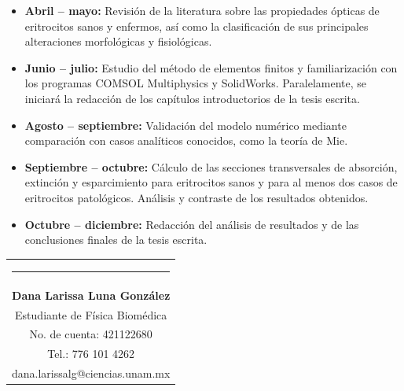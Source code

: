 \documentclass[11pt,letterpaper]{article}
\begin{document}
	\begin{itemize} 
		\item \textbf{Abril – mayo:} Revisión de la literatura sobre las propiedades ópticas de eritrocitos sanos y enfermos, así como la clasificación de sus principales alteraciones morfológicas y fisiológicas.
		\item \textbf{Junio – julio:} Estudio del método de elementos finitos y familiarización con los programas COMSOL Multiphysics y SolidWorks. Paralelamente, se iniciará la redacción de los capítulos introductorios de la tesis escrita.
		
		\item \textbf{Agosto – septiembre:} Validación del modelo numérico mediante comparación con casos analíticos conocidos, como la teoría de Mie.
		
		\item \textbf{Septiembre – octubre:} Cálculo de las secciones transversales de absorción, extinción y esparcimiento para eritrocitos sanos y para al menos dos casos de eritrocitos patológicos. Análisis y contraste de los resultados obtenidos.
		
		\item \textbf{Octubre – diciembre:} Redacción del análisis de resultados y de las conclusiones finales de la tesis escrita.
	\end{itemize}
	
	
	
	\bigskip
	
	{\vspace{2.55cm}\begin{tabular} { c}
			\setlength{\tabcolsep}{15pt}
			\renewcommand{\arraystretch}{1}
			\noindent\rule{5.5cm}{0.4pt}\qquad \\
			
			\qquad  \textbf{Dana Larissa Luna González} \qquad \\
			\qquad Estudiante de Física Biomédica  \qquad \\ \qquad 
			No. de cuenta: 421122680\qquad \\  
			\qquad  Tel.: 776 101 4262 \qquad \\
			\qquad dana.larissalg@ciencias.unam.mx \qquad \\
			
		\end{tabular}
	}
	
\end{document}
